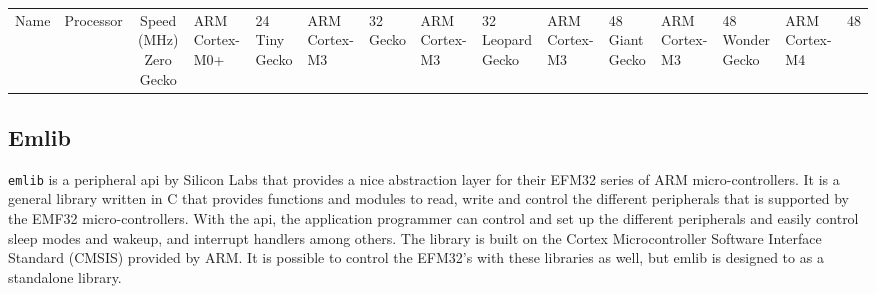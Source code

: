 \begin{centering}
\begin{tabular}{c|c|c}
Name & Processor & Speed (MHz)
Zero Gecko    & ARM Cortex-M0+ & 24
Tiny Gecko    & ARM Cortex-M3  & 32
Gecko         & ARM Cortex-M3  & 32
Leopard Gecko & ARM Cortex-M3  & 48
Giant Gecko   & ARM Cortex-M3  & 48
Wonder Gecko  & ARM Cortex-M4  & 48
\caption{EFM32}
\label{tab:efm32_family}
\end{tabular}
\end{centering}

\subsection{Emlib} %
\label{sub:emlib}

\texttt{emlib} is a peripheral \gls{api} by Silicon Labs that provides a nice abstraction
layer for their EFM32 series of ARM micro-controllers. It is a general library written in C that
provides functions and modules to read, write and control the different peripherals that is
supported by the EMF32 micro-controllers. With the \gls{api}, the application programmer can control
and set up the different peripherals and easily control sleep modes and wakeup, and interrupt
handlers among others. The library is built on the Cortex Microcontroller Software Interface Standard
(CMSIS) provided by ARM. It is possible to control the EFM32's with these libraries as well, but
emlib is designed to as a standalone library.
